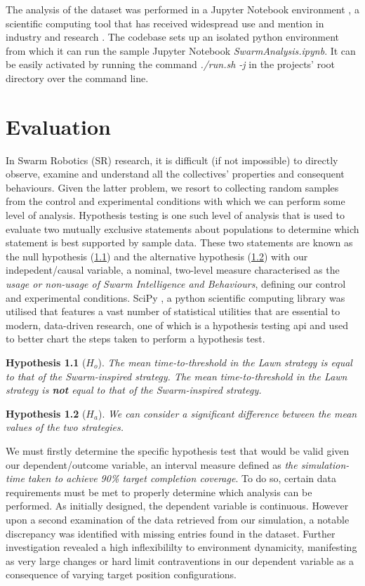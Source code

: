 \documentclass{report}
\newtheorem*{hyp}{Hypothesis}
\begin{document}
The analysis of the dataset was performed in a Jupyter Notebook environment \cite{Jupyter}, a scientific computing tool that has received widespread use and mention in industry and research \cite{Helen2014} \cite{ACM2017}. The codebase sets up an isolated python environment from which it can run the sample Jupyter Notebook \textit{SwarmAnalysis.ipynb}. It can be easily activated by running the command \textit{./run.sh -j} in the projects' root directory over the command line.

\chapter{Evaluation} \label{evaluation}

In Swarm Robotics (SR) research, it is difficult (if not impossible) to directly observe, examine and understand all the collectives' properties and consequent behaviours. Given the latter problem, we resort to collecting random samples from the control and experimental conditions with which we can perform some level of analysis. Hypothesis testing is one such level of analysis that is used to evaluate two mutually exclusive statements about populations to determine which statement is best supported by sample data. These two statements are known as the null hypothesis (\ref{hyp:null2}) and the alternative hypothesis (\ref{hyp:alt2}) with our indepedent/causal variable, a nominal, two-level measure characterised as the \textit{usage or non-usage of Swarm Intelligence and Behaviours}, defining our control and experimental conditions. SciPy \cite{SCIPY}, a python scientific computing library was utilised that features a vast number of statistical utilities that are essential to modern, data-driven research, one of which is a hypothesis testing api and \cite{bmgi} used to better chart the steps taken to perform a hypothesis test.

\begin{hyp}[$H_o$]\label{hyp:null2}
	The mean time-to-threshold in the Lawn strategy is equal to that of the Swarm-inspired strategy.
	The mean time-to-threshold in the Lawn strategy is \textbf{not} equal to that of the Swarm-inspired strategy.
\end{hyp}
	
\begin{hyp}[$H_a$]\label{hyp:alt2}
	We can consider a significant difference between the mean values of the two strategies.
\end{hyp}

 We must firstly determine the specific hypothesis test that would be valid given our dependent/outcome variable, an interval measure defined as \textit{the simulation-time taken to achieve 90\% target completion coverage}. To do so, certain data requirements must be met to properly determine which analysis can be performed. As initially designed, the dependent variable is continuous. However upon a second examination of the data retrieved from our simulation, a notable discrepancy was identified with missing entries found in the dataset. Further investigation revealed a high inflexibililty to environment dynamicity, manifesting as very large changes or hard limit contraventions in our dependent variable as a consequence of varying target position configurations.
\end{document}
